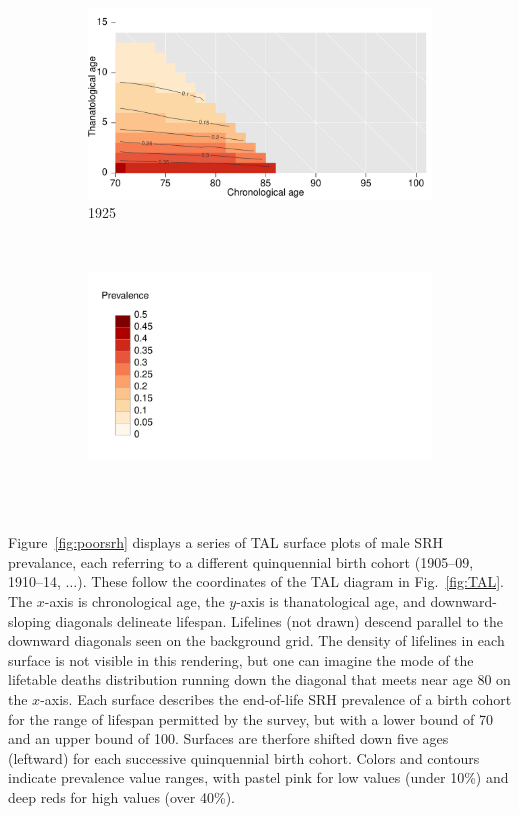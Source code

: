 \documentclass[12pt,oneside,a4paper]{article} %
\theoremstyle{definition}
\begin{document}
\begin{figure}[h!]
\begin{subfigure}{.46\textwidth}
\centering
\caption{1925}
\vspace{-1em}
\label{fig:srh1925}
\includegraphics[scale=0.32]{Figures/TALapplication/srhpoor1925.pdf}
\end{subfigure}
~
\begin{subfigure}{.46\textwidth}
\centering
\caption*{~}
\vspace{-1em}
\label{fig:srhlegend}
\includegraphics[scale=0.32]{Figures/TALapplication/Legend.pdf}
\end{subfigure}
\end{figure} 

Figure~\ref{fig:poorsrh} displays a series of TAL surface plots of male SRH
prevalance, each referring to a different quinquennial birth cohort (1905--09, 1910--14, $\dots$). These follow the coordinates of the TAL diagram in Fig.~\ref{fig:TAL}.
The $x$-axis is chronological age, the $y$-axis is thanatological age, and
downward-sloping diagonals delineate lifespan. Lifelines (not drawn) descend
parallel to the downward diagonals seen on the background grid. The density of
lifelines in each surface is not visible in this rendering, but one can imagine
the mode of the lifetable deaths distribution running down the diagonal that
meets near age 80 on the $x$-axis. Each surface describes the end-of-life SRH
prevalence of a birth cohort for the range of lifespan permitted by the survey,
but with a lower bound of 70 and an upper bound of 100. Surfaces are therfore
shifted down five ages (leftward) for each successive quinquennial birth cohort.
Colors and contours indicate prevalence value ranges, with pastel pink for low
values (under 10\%) and deep reds for high values (over 40\%).
\end{document}
